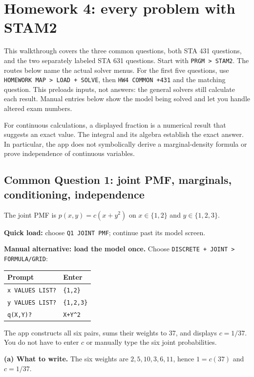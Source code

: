 \section{Homework 4: every problem with STAM2}
\label{sec:hw4-app-walkthrough}
This walkthrough covers the three common questions, both STA 431 questions, and the two separately labeled STA 631 questions. Start with \texttt{PRGM > STAM2}. The routes below name the actual solver menus. For the first five questions, use \texttt{HOMEWORK MAP > LOAD + SOLVE}, then \texttt{HW4 COMMON +431} and the matching question. This preloads inputs, not answers: the general solvers still calculate each result. Manual entries below show the model being solved and let you handle altered exam numbers.

For continuous calculations, a displayed fraction is a numerical result that suggests an exact value. The integral and its algebra establish the exact answer. In particular, the app does not symbolically derive a marginal-density formula or prove independence of continuous variables.

\subsection{Common Question 1: joint PMF, marginals, conditioning, independence}
The joint PMF is $p(x,y)=c(x+y^2)$ on $x\in\{1,2\}$ and $y\in\{1,2,3\}$.

\textbf{Quick load:} choose \texttt{Q1 JOINT PMF}; continue past its model screen.\par
\textbf{Manual alternative: load the model once.} Choose \texttt{DISCRETE + JOINT > FORMULA/GRID}:
\begin{center}
\begin{tabular}{@{}ll@{}}
\toprule Prompt & Enter\\\midrule
\texttt{x VALUES LIST?} & \texttt{\{1,2\}}\\
\texttt{y VALUES LIST?} & \texttt{\{1,2,3\}}\\
\texttt{q(X,Y)?} & \texttt{X+Y\^{}2}\\\bottomrule
\end{tabular}
\end{center}
The app constructs all six pairs, sums their weights to 37, and displays $c=1/37$. You do not have to enter $c$ or manually type the six joint probabilities.

\textbf{(a) What to write.} The six weights are $2,5,10,3,6,11$, hence $1=c(37)$ and $\boxed{c=1/37}$.

